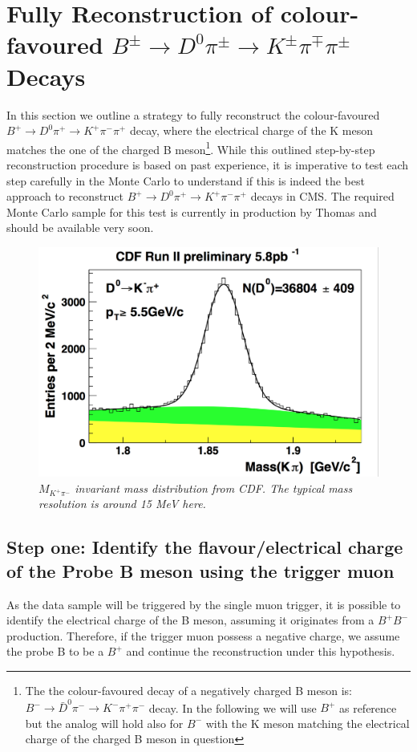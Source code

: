 \documentclass[a4paper,11pt]{article}
\begin{document}
\newpage
\appendix

\section{Fully Reconstruction of colour-favoured $B^{\pm} \rightarrow D^0 \pi^{\pm} \rightarrow K^{\pm}  \pi^{\mp} \pi^{\pm}$ Decays}\label{A}
In this section we outline a strategy to fully reconstruct the colour-favoured $B^{+} \rightarrow D^0 \pi^{+} \rightarrow K^{+}  \pi^{-} \pi^{+}$ decay, where the electrical charge of the K meson matches the one of the charged B meson\footnote{The the colour-favoured decay of a negatively charged B meson is: $B^{-} \rightarrow \bar{D}^0 \pi^{-} \rightarrow K^{-}  \pi^{+} \pi^{-}$ decay. In the following we will use $B^{+}$ as reference but the analog will hold also for $B^{-}$ with the K meson matching the electrical charge of the charged B meson in question}. 
While this outlined step-by-step reconstruction procedure is based on past experience, it is imperative to test each step carefully in the Monte Carlo to understand if this is indeed the best approach to reconstruct $B^{+} \rightarrow D^0 \pi^{+} \rightarrow K^{+}  \pi^{-} \pi^{+}$ decays in CMS.  The required Monte Carlo sample for this test is currently in production by Thomas and should be available very soon.  
 

\begin{figure}[htb]
\centering
\includegraphics[scale=0.30]{CDF-Kpi}
\caption{\it $M_{K^+ \pi^-}$ invariant mass distribution from CDF.  The typical mass resolution is around 15 MeV here. \label{fig:Kpi}}
\end{figure}


\subsection{Step one: Identify the flavour/electrical charge of the Probe B meson using the trigger muon}
As the data sample will be triggered by the single muon trigger, it is possible to identify the electrical charge of the B meson, assuming it originates from a $B^+B^-$ production. Therefore, if the trigger muon possess a negative charge, we assume the probe B to be a $B^+$ and continue the reconstruction under this hypothesis. 
\end{document}

